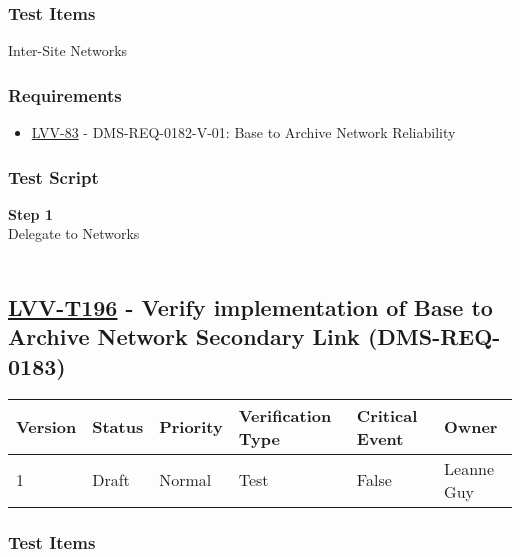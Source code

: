 \hypertarget{test-items-171}{%
\subsubsection{Test Items}\label{test-items-171}}

Inter-Site Networks~

\hypertarget{requirements-172}{%
\subsubsection{Requirements}\label{requirements-172}}

\begin{itemize}
\tightlist
\item
  \href{https://jira.lsstcorp.org/browse/LVV-83}{LVV-83} -
  DMS-REQ-0182-V-01: Base to Archive Network Reliability
\end{itemize}

\hypertarget{test-script-172}{%
\subsubsection{Test Script}\label{test-script-172}}

\textbf{Step 1}\\
Delegate to Networks\\
~\\

\hypertarget{lvv-t196---verify-implementation-of-base-to-archive-network-secondary-link-dms-req-0183}{%
\subsection{\texorpdfstring{\href{https://jira.lsstcorp.org/secure/Tests.jspa\#/testCase/LVV-T196}{LVV-T196}
- Verify implementation of Base to Archive Network Secondary Link
(DMS-REQ-0183)}{LVV-T196 - Verify implementation of Base to Archive Network Secondary Link (DMS-REQ-0183)}}\label{lvv-t196---verify-implementation-of-base-to-archive-network-secondary-link-dms-req-0183}}

\begin{longtable}[]{@{}llllll@{}}
\toprule
Version & Status & Priority & Verification Type & Critical Event &
Owner\tabularnewline
\midrule
\endhead
1 & Draft & Normal & Test & False & Leanne Guy\tabularnewline
\bottomrule
\end{longtable}

\hypertarget{test-items-172}{%
\subsubsection{Test Items}\label{test-items-172}}

